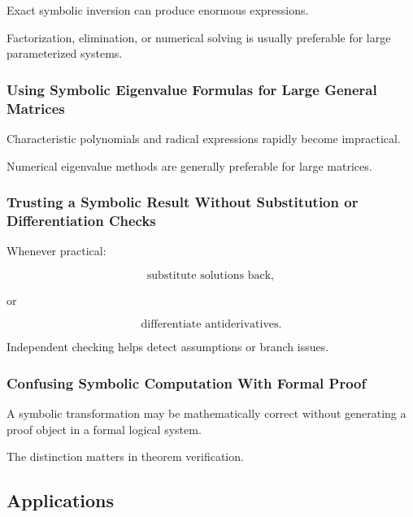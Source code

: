 Exact symbolic inversion can produce enormous expressions.

Factorization, elimination, or numerical solving is usually preferable for
large parameterized systems.

\subsubsection{Using Symbolic Eigenvalue Formulas for Large General Matrices}

Characteristic polynomials and radical expressions rapidly become
impractical.

Numerical eigenvalue methods are generally preferable for large matrices.

\subsubsection{Trusting a Symbolic Result Without Substitution or Differentiation Checks}

Whenever practical:

\[
\boxed{
\text{substitute solutions back},
}
\]

or

\[
\boxed{
\text{differentiate antiderivatives}.
}
\]

Independent checking helps detect assumptions or branch issues.

\subsubsection{Confusing Symbolic Computation With Formal Proof}

A symbolic transformation may be mathematically correct without generating
a proof object in a formal logical system.

The distinction matters in theorem verification.

\subsection{Applications}
\label{subsec:symbolic-computation-applications}

